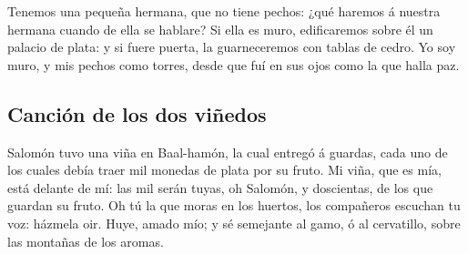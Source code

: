  Tenemos una pequeña hermana, que no tiene pechos: ¿qué
haremos á nuestra hermana cuando de ella se hablare?  Si
ella es muro, edificaremos sobre él un palacio de plata: y si fuere
puerta, la guarneceremos con tablas de cedro.  Yo soy muro,
y mis pechos como torres, desde que fuí en sus ojos como la que halla
paz.

\hypertarget{canciuxf3n-de-los-dos-viuxf1edos}{%
\subsection{Canción de los dos
viñedos}\label{canciuxf3n-de-los-dos-viuxf1edos}}

 Salomón tuvo una viña en Baal-hamón, la cual entregó á
guardas, cada uno de los cuales debía traer mil monedas de plata por su
fruto.  Mi viña, que es mía, está delante de mí: las mil
serán tuyas, oh Salomón, y doscientas, de los que guardan su fruto.
 Oh tú la que moras en los huertos, los compañeros escuchan
tu voz: házmela oir.  Huye, amado mío; y sé semejante al
gamo, ó al cervatillo, sobre las montañas de los aromas.

